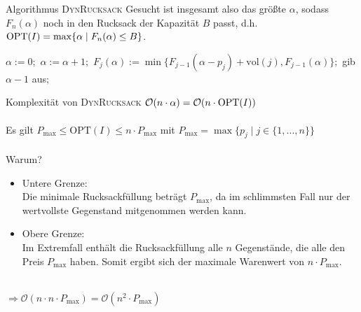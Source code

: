 \begin{frame}{Algorithmus \textsc{DynRucksack}}
    Gesucht ist insgesamt also das größte $\alpha$, sodass $F_n(\alpha)$ noch in den Rucksack der Kapazität $B$
    passt, d.h. $\operatorname{OPT}(I)=\max\{ \alpha \mid F_n(\alpha) \leq B \}$.
    
    
    \begin{algorithmic}
        \State $\alpha:=0;$
        \Repeat
        \State $\alpha:=\alpha+1;$
        \State $F_j(\alpha):=\min\{F_{j-1}(\alpha-p_j)+\text{vol}(j),F_{j-1}(\alpha)\};$
        \EndFor
        \State gib $\alpha-1$ aus$;$
    \end{algorithmic}
\end{frame}
\begin{frame}{Komplexität von \textsc{DynRucksack}}
    $\mathcal{O}( n \cdot \alpha) = \mathcal{O}( n \cdot \operatorname{OPT}(I))$ \\~\\
    \pause    
    Es gilt $P_{\text{max}} \leq \text{OPT}(I) \leq n \cdot P_{\text{max}}$ 
    mit $P_{\text{max}}=\max\{p_j \mid j \in \{1,...,n\}\}$ \\~\\
    \pause
    Warum?
    \begin{itemize}
        \item Untere Grenze: \\ Die minimale Rucksackfüllung beträgt $P_{\text{max}}$, da im schlimmsten Fall nur der wertvollste Gegenstand mitgenommen werden kann.
        \item Obere Grenze:  \\ Im Extremfall enthält die Rucksackfüllung alle $n$ Gegenstände, die alle den Preis $P_{\text{max}}$ haben. Somit ergibt sich der maximale Warenwert von $n \cdot P_{\text{max}}$.
    \end{itemize} ~\\
    
    $\Rightarrow \mathcal{O}( n \cdot n \cdot P_{\max}) = \mathcal{O}( n^2 \cdot P_{\max})$    
\end{frame}
